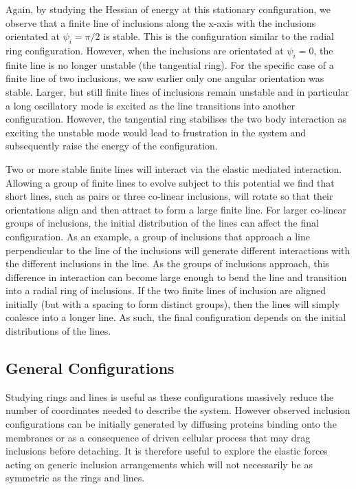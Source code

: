Again, by studying the Hessian of energy at this stationary configuration, we observe that a finite line of inclusions along the x-axis with the inclusions orientated at $\psi_i=\pi/2$ is stable. This is the configuration similar to the radial ring configuration. However, when the inclusions are orientated at $\psi_i=0$, the finite line is no longer unstable (the tangential ring). For the specific case of a finite line of two inclusions, we saw earlier only one angular orientation was stable. Larger, but still finite lines of inclusions remain unstable and in particular a long oscillatory mode is excited as the line transitions into another configuration.  However, the tangential ring stabilises the two body interaction as exciting the unstable mode would lead to frustration in the system and subsequently raise the energy of the configuration.


 Two or more stable finite lines will interact via the elastic mediated interaction. Allowing a group of finite lines to evolve subject to this potential we find that short lines, such as pairs or three co-linear inclusions, will rotate so that their orientations align and then attract to form a large finite line. For larger co-linear groups of inclusions, the initial distribution of the lines can affect the final configuration. As an example, a group of inclusions that approach a line perpendicular to the line of the inclusions will generate different interactions with the different inclusions in the line. As the groups of inclusions approach, this difference in interaction can become large enough to bend the line and transition into a radial ring of inclusions. If the two finite lines of inclusion are aligned initially (but with a spacing to form distinct groups), then the lines will simply coalesce into a longer line. As such, the final configuration depends on the initial distributions of the lines.

\subsection{General Configurations}
Studying rings and lines is useful as these configurations massively reduce the number of coordinates needed to describe the system. However observed inclusion configurations can be initially generated by diffusing proteins binding onto the membranes or as a consequence of driven cellular process that may drag inclusions before detaching. It is therefore useful to explore the elastic forces acting on generic inclusion arrangements which will not necessarily be as symmetric as the rings and lines.

